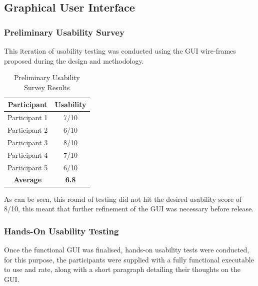    \clearpage
    \subsection{Graphical User Interface}

        \subsubsection{Preliminary Usability Survey}
        This iteration of usability testing was conducted using the GUI wire-frames proposed during the design and methodology.

        \FloatBarrier
        \begin{table}[ht]
            \centering
            \caption{Preliminary Usability Survey Results}
            \label{tab:preliminary_usability_survey}
            \begin{tabular}{c|c}
                \textbf{Participant} & \textbf{Usability} \\
                \hline\hline
                Participant 1 & 7/10 \\ \hline
                Participant 2 & 6/10 \\ \hline
                Participant 3 & 8/10 \\ \hline
                Participant 4 & 7/10 \\ \hline
                Participant 5 & 6/10 \\
                \hline\hline
                \textbf{Average} & \textbf{6.8} \\
            \end{tabular}
        \end{table}
        \FloatBarrier
        As can be seen, this round of testing did not hit the desired usability score of 8/10, this meant that further refinement of the GUI was necessary before release.

        \subsubsection{Hands-On Usability Testing}
        Once the functional GUI was finalised, hands-on usability tests were conducted, for this purpose, the participants were supplied with a fully functional executable to use and rate, along with a short paragraph detailing their thoughts on the GUI.


